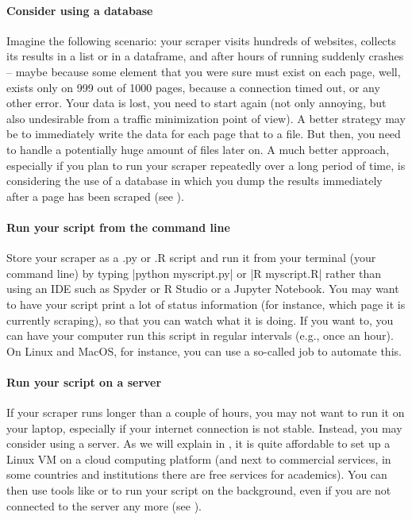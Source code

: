\paragraph{Consider using a database} Imagine the following scenario: your scraper visits hundreds of websites, collects its results in a list or in a dataframe, and after hours of running suddenly crashes -- maybe because some element that you were sure must exist on each page, well, exists only on 999 out of 1000 pages, because a connection timed out, or any other error. Your data is lost, you need to start again (not only annoying, but also undesirable from a traffic minimization point of view). A better strategy may be to immediately write the data for each page that to a file. But then, you need to handle a potentially huge amount of files later on. A much better approach, especially if you plan to run your scraper repeatedly over a long period of time, is considering the use of a database in which you dump the results immediately after a page has been scraped (see ).

\paragraph{Run your script from the command line} Store your scraper as a .py or .R script and run it from your terminal (your command line) by typing |python myscript.py| or |R myscript.R| rather than using an IDE such as Spyder or R Studio or a Jupyter Notebook. You may want to have your script print a lot of status information (for instance, which page it is currently scraping), so that you can watch what it is doing. If you want to, you can have your computer run this script in regular intervals (e.g., once an hour). On Linux and MacOS, for instance, you can use a so-called  job to automate this.

\paragraph{Run your script on a server} If your scraper runs longer than a couple of hours, you may not want to run it on your laptop, especially if your internet connection is not stable. Instead, you may consider using a server. As we will explain in , it is quite affordable to set up a Linux VM on a cloud computing platform (and next to commercial services, in some countries and institutions there are free services for academics). You can then use tools like  or  to run your script on the background, even if you are not connected to the server any more (see ).
